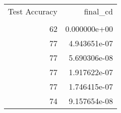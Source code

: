 \begin{tabular}{rr}
\toprule
 Test Accuracy &      final\_cd \\
               &               \\
\midrule
            62 &  0.000000e+00 \\
            77 &  4.943651e-07 \\
            77 &  5.690306e-08 \\
            77 &  1.917622e-07 \\
            77 &  1.746415e-07 \\
            74 &  9.157654e-08 \\
\bottomrule
\end{tabular}
